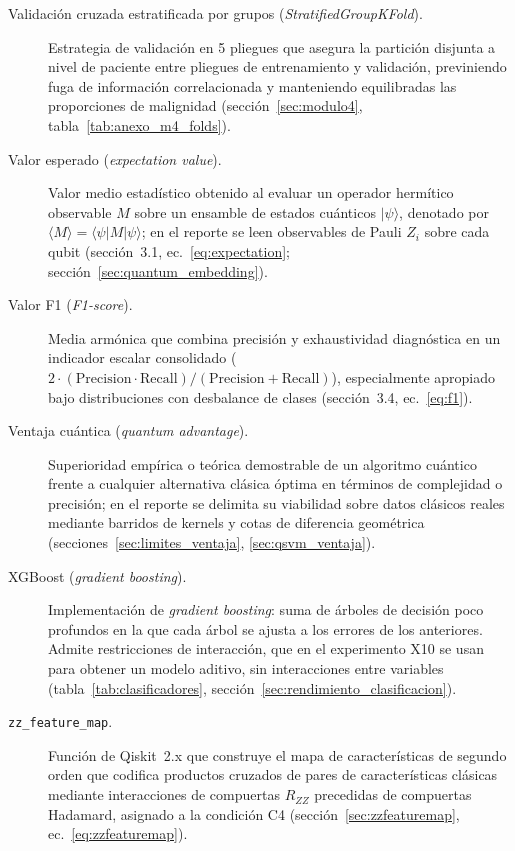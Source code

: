 \begin{description}
  \item[Validación cruzada estratificada por grupos (\textit{StratifiedGroupKFold}).] Estrategia de validación en 5 pliegues que asegura la partición disjunta a nivel de paciente entre pliegues de entrenamiento y validación, previniendo fuga de información correlacionada y manteniendo equilibradas las proporciones de malignidad (sección~\ref{sec:modulo4}, tabla~\ref{tab:anexo_m4_folds}).

  \item[Valor esperado (\textit{expectation value}).] Valor medio estadístico obtenido al evaluar un operador hermítico observable $M$ sobre un ensamble de estados cuánticos $|\psi\rangle$, denotado por $\langle M \rangle = \langle \psi|M|\psi\rangle$; en el reporte se leen observables de Pauli $Z_i$ sobre cada qubit (sección~3.1, ec.~\ref{eq:expectation}; sección~\ref{sec:quantum_embedding}).

  \item[Valor F1 (\textit{F1-score}).] Media armónica que combina precisión y exhaustividad diagnóstica en un indicador escalar consolidado ($2 \cdot (\mathrm{Precision} \cdot \mathrm{Recall}) / (\mathrm{Precision} + \mathrm{Recall})$), especialmente apropiado bajo distribuciones con desbalance de clases (sección~3.4, ec.~\ref{eq:f1}).

  \item[Ventaja cuántica (\textit{quantum advantage}).] Superioridad empírica o teórica demostrable de un algoritmo cuántico frente a cualquier alternativa clásica óptima en términos de complejidad o precisión; en el reporte se delimita su viabilidad sobre datos clásicos reales mediante barridos de kernels y cotas de diferencia geométrica (secciones~\ref{sec:limites_ventaja}, \ref{sec:qsvm_ventaja}).

  \item[XGBoost (\textit{gradient boosting}).] Implementación de \textit{gradient boosting}: suma de árboles de decisión poco profundos en la que cada árbol se ajusta a los errores de los anteriores. Admite restricciones de interacción, que en el experimento X10 se usan para obtener un modelo aditivo, sin interacciones entre variables (tabla~\ref{tab:clasificadores}, sección~\ref{sec:rendimiento_clasificacion}).

  \item[\texttt{zz\_feature\_map}.] Función de Qiskit~2.x que construye el mapa de características de segundo orden que codifica productos cruzados de pares de características clásicas mediante interacciones de compuertas $R_{ZZ}$ precedidas de compuertas Hadamard, asignado a la condición C4 (sección~\ref{sec:zzfeaturemap}, ec.~\ref{eq:zzfeaturemap}).
\end{description}
